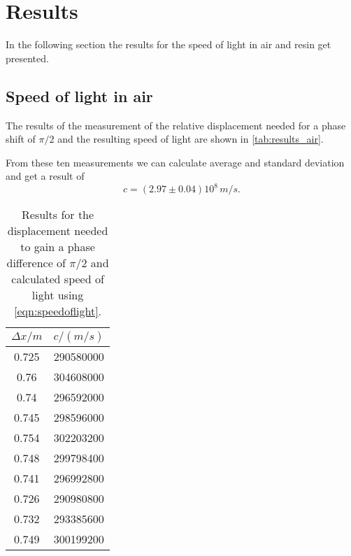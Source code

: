 \section{Results}
\label{sec:results}
In the following section the results for the speed of light in air and resin get presented.

\subsection{Speed of light in air}
The results of the measurement of the relative displacement needed for a phase shift of $\pi / 2$ and
the resulting speed of light are shown in \autoref{tab:results_air}.

From these ten measurements we can calculate average and standard deviation and get a result of
\begin{equation}
  c = (2.97 \pm 0.04) 10^8 \, \si{m/s}.
\end{equation}

\begin{table}
  \centering
  \caption{Results for the displacement needed to gain a phase difference of $\pi/2$ and
  calculated speed of light using \autoref{eqn:speedoflight}.}
  \label{tab:results_air}
  \begin{tabular}{c | c}
    $\Delta x / \si{m}$ & $c / (\si{m/s})$\\
    \hline
    0.725 & 290580000\\
    0.76  & 304608000\\
    0.74  & 296592000\\
    0.745 & 298596000\\
    0.754 & 302203200\\
    0.748 & 299798400\\
    0.741 & 296992800\\
    0.726 & 290980800\\
    0.732 & 293385600\\
    0.749 & 300199200\\
  \end{tabular}
\end{table}


